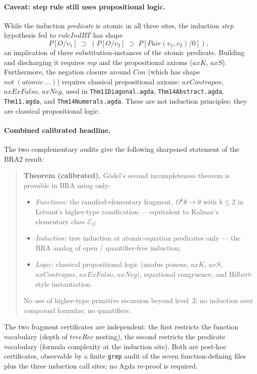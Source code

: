 \documentclass[11pt]{article}
\begin{document}
\paragraph{Caveat: step rule still uses propositional logic.}
While the induction \emph{predicate} is atomic in all three sites,
the induction \emph{step} hypothesis fed to $\mathit{ruleIndBT}$
has shape
\[
  P[O/v_1] \;\supset\; (P[O/v_2] \;\supset\; P[\mathit{Pair}(v_1, v_2)/0]),
\]
an implication of three substitution-instances of the atomic
predicate.  Building and discharging it requires
$\mathit{mp}$ and the propositional axioms ($\mathit{axK}$,
$\mathit{axS}$).  Furthermore, the negation closure around
$\mathit{Con}$ (which has shape
$\mathit{not}\;(\mathit{atomic}\;\ldots)$) requires classical
propositional axioms: $\mathit{axContrapos}$, $\mathit{axExFalso}$,
$\mathit{axNeg}$, used in
\verb|Thm11Diagonal.agda|, \verb|Thm14Abstract.agda|,
\verb|Thm11.agda|, and \verb|Thm14Numerals.agda|.  These are not
induction principles; they are classical propositional logic.

\paragraph{Combined calibrated headline.}
The two complementary audits give the following sharpened statement
of the BRA2 result:
\begin{quote}
\textbf{Theorem (calibrated).}  G\"odel's second incompleteness
theorem is provable in BRA using only:
\begin{itemize}
  \item \emph{Functions:} the ramified-elementary fragment, $\Omega^k\theta \to \theta$
        with $k \le 2$ in Leivant's higher-type ramification --- equivalent
        to Kalmar's elementary class $\mathcal{E}_3$;
  \item \emph{Induction:} tree induction at atomic-equation predicates
        only --- the BRA analog of open / quantifier-free induction;
  \item \emph{Logic:} classical propositional logic (modus ponens,
        $\mathit{axK}$, $\mathit{axS}$, $\mathit{axContrapos}$,
        $\mathit{axExFalso}$, $\mathit{axNeg}$), equational
        congruence, and Hilbert-style instantiation.
\end{itemize}
No use of higher-type primitive recursion beyond level~2; no
induction over compound formulas; no quantifiers.
\end{quote}
The two fragment certificates are independent: the first restricts
the function vocabulary (depth of $\mathit{treeRec}$ nesting), the
second restricts the predicate vocabulary (formula complexity at the
induction site).  Both are post-hoc certificates, observable by a
finite \verb|grep| audit of the seven function-defining files plus
the three induction call sites; no Agda re-proof is required.
\end{document}
